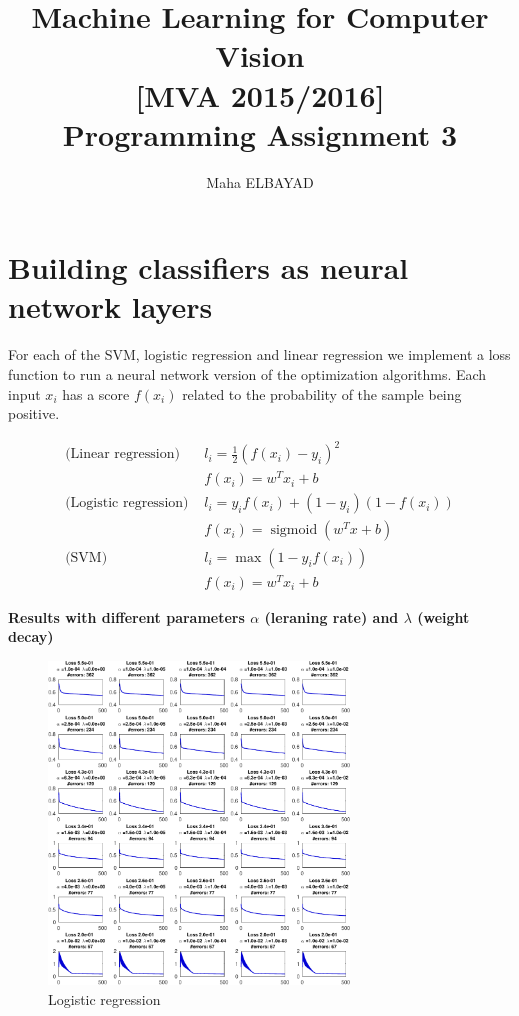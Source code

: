 \documentclass{acmsiggraph}
\title{Machine Learning for Computer Vision\\ {\large [MVA 2015/2016]}\\
\vspace{10pt}
Programming Assignment 3}
\author{Maha ELBAYAD
}
\newcommand{\1}{\mathbbm{1}}
\DeclareMathOperator\sig{sigmoid}
\begin{document}
\maketitle
\section{Building classifiers as neural network layers}
For each of the SVM, logistic regression and linear regression we implement a loss function to run a neural network version of the optimization algorithms. Each input $x_i$ has a score $f(x_i)$ related to the probability of the sample being  positive.

\begin{align*}
\text{(Linear regression) } & l_i = \frac{1}{2}(f(x_i)-y_i)^2\\
&  f(x_i) = w^Tx_i+b\\
\text{(Logistic regression) } & l_i = y_if(x_i)+(1-y_i)(1-f(x_i))\\
& f(x_i)= \sig(w^Tx+b)\\
\text{(SVM) } & l_i = \max(1-y_if(x_i))\\
&  f(x_i) = w^Tx_i+b
\end{align*}

\textbf{Results with different parameters $\alpha$ (leraning rate) and $\lambda$ (weight decay)}
\begin{figure}[H]
\centering
\includegraphics[width=8cm]{logit}
\caption{Logistic regression}
\end{figure}
\end{document}
